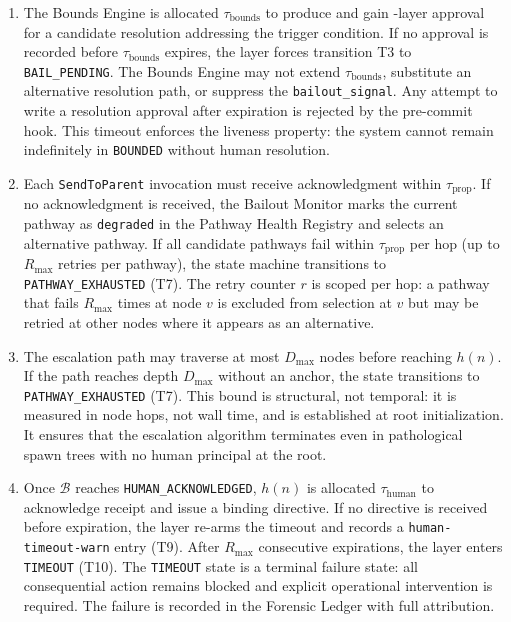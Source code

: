 \begin{enumerate}\itemsep=0pt
\item[$\mathbf{\tau_{\text{bounds}}}$ \textbf{--- \texttt{BOUNDED} state timeout.}] The Bounds Engine is allocated $\tau_{\text{bounds}}$ to produce and gain \fact{}-layer approval for a candidate resolution addressing the trigger condition. If no approval is recorded before $\tau_{\text{bounds}}$ expires, the \fact{} layer forces transition T3 to \texttt{BAIL\_PENDING}. The Bounds Engine may not extend $\tau_{\text{bounds}}$, substitute an alternative resolution path, or suppress the \texttt{bailout\_signal}. Any attempt to write a resolution approval after expiration is rejected by the pre-commit hook. This timeout enforces the liveness property: the system cannot remain indefinitely in \texttt{BOUNDED} without human resolution.

\item[$\mathbf{\tau_{\text{prop}}}$ \textbf{--- Propagation timeout.}] Each \texttt{SendToParent} invocation must receive acknowledgment within $\tau_{\text{prop}}$. If no acknowledgment is received, the Bailout Monitor marks the current pathway as \texttt{degraded} in the Pathway Health Registry and selects an alternative pathway. If all candidate pathways fail within $\tau_{\text{prop}}$ per hop (up to $R_{\max}$ retries per pathway), the state machine transitions to \texttt{PATHWAY\_EXHAUSTED} (T7). The retry counter $r$ is scoped per hop: a pathway that fails $R_{\max}$ times at node $v$ is excluded from selection at $v$ but may be retried at other nodes where it appears as an alternative.

\item[$\mathbf{\tau_{\text{cap}}}$ \textbf{--- Cascade depth limit.}] The escalation path may traverse at most $D_{\max}$ nodes before reaching $h(n)$. If the path reaches depth $D_{\max}$ without an anchor, the state transitions to \texttt{PATHWAY\_EXHAUSTED} (T7). This bound is structural, not temporal: it is measured in node hops, not wall time, and is established at root initialization. It ensures that the escalation algorithm terminates even in pathological spawn trees with no human principal at the root.

\item[$\mathbf{\tau_{\text{human}}}$ \textbf{--- Human acknowledgment timeout.}] Once $\mathcal{B}$ reaches \texttt{HUMAN\_ACKNOWLEDGED}, $h(n)$ is allocated $\tau_{\text{human}}$ to acknowledge receipt and issue a binding directive. If no directive is received before expiration, the \fact{} layer re-arms the timeout and records a \texttt{human-timeout-warn} entry (T9). After $R_{\max}$ consecutive expirations, the \fact{} layer enters \texttt{TIMEOUT} (T10). The \texttt{TIMEOUT} state is a terminal failure state: all consequential action remains blocked and explicit operational intervention is required. The failure is recorded in the Forensic Ledger with full attribution.
\end{enumerate}

